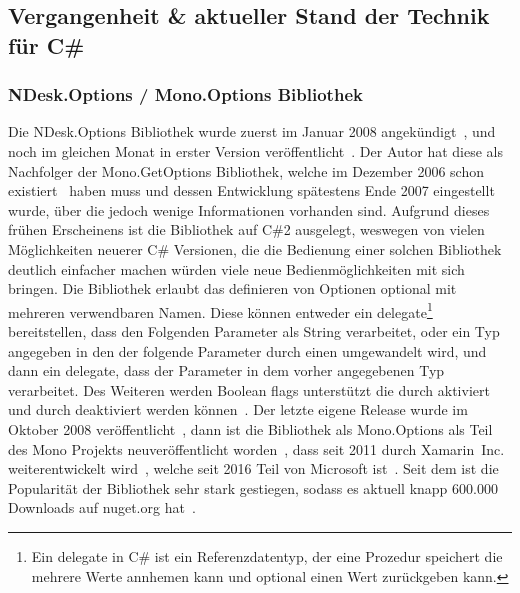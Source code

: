   \subsection{Vergangenheit \& aktueller Stand der Technik für C\#}\label{subsec:CurrentState}
  \subsubsection{NDesk.Options / Mono.Options Bibliothek}
  Die NDesk.Options Bibliothek wurde zuerst im Januar 2008 angekündigt~\cite{NDeskAnnouncement},
  und noch im gleichen Monat in erster Version veröffentlicht~\cite{NDesk1stRelease}.
  Der Autor hat diese als Nachfolger der Mono.GetOptions Bibliothek,
  welche im Dezember 2006 schon existiert~\cite{MonoGetOptions3rdBlogPost} haben muss und dessen Entwicklung spätestens Ende 2007 eingestellt wurde,
  über die jedoch wenige Informationen vorhanden sind.
  Aufgrund dieses frühen Erscheinens ist die Bibliothek auf C\#2 ausgelegt, weswegen von vielen Möglichkeiten neuerer C\# Versionen,
  die die Bedienung einer solchen Bibliothek deutlich einfacher machen würden viele neue Bedienmöglichkeiten mit sich bringen.
  Die Bibliothek erlaubt das definieren von Optionen optional mit mehreren verwendbaren Namen.
  Diese können entweder ein delegate\footnote{Ein delegate in C\# ist ein Referenzdatentyp, der eine Prozedur speichert die mehrere Werte annhemen kann und optional einen Wert zurückgeben kann.} bereitstellen, dass den Folgenden Parameter als String verarbeitet,
  oder ein Typ angegeben in den der folgende Parameter durch einen  umgewandelt wird,
  und dann ein delegate, dass der Parameter in dem vorher angegebenen Typ verarbeitet.
  Des Weiteren werden Boolean flags unterstützt die durch  aktiviert
  und durch  deaktiviert werden können~\cite{NDeskOptionSetDocumentation}.
  Der letzte eigene Release wurde im Oktober 2008 veröffentlicht~\cite{NDeskOptionsLastRelease},
  dann ist die Bibliothek als Mono.Options als Teil des Mono Projekts neuveröffentlicht worden~\cite{MonoOptions1stCommit},
  dass seit 2011 durch Xamarin~Inc. weiterentwickelt wird~\cite{MonoFutureInterview}, welche seit 2016 Teil von Microsoft ist~\cite{MicrosoftBlogAcquireXamarin}.
  Seit dem ist die Popularität der Bibliothek sehr stark gestiegen, sodass es aktuell knapp 600.000 Downloads auf nuget.org hat~\cite{MonoOptionsNuget}.
